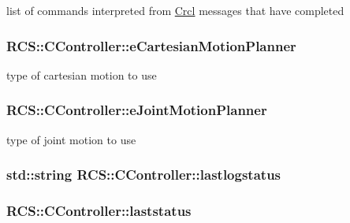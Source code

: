 list of commands interpreted from \hyperlink{namespaceCrcl}{Crcl} messages that have completed \hypertarget{structRCS_1_1CController_a4174fd5467045e780fe53bde42e70735}{
\subsubsection[{e\-Cartesian\-Motion\-Planner}]{ R\-C\-S\-::\-C\-Controller\-::e\-Cartesian\-Motion\-Planner}}\label{structRCS_1_1CController_a4174fd5467045e780fe53bde42e70735}
type of cartesian motion to use \hypertarget{structRCS_1_1CController_ad788d0def2101be74b680394bcbc78e7}{
\subsubsection[{e\-Joint\-Motion\-Planner}]{ R\-C\-S\-::\-C\-Controller\-::e\-Joint\-Motion\-Planner}}\label{structRCS_1_1CController_ad788d0def2101be74b680394bcbc78e7}
type of joint motion to use \hypertarget{structRCS_1_1CController_a8bd2705747d1e16f5806ddf183bfade7}{
\subsubsection[{lastlogstatus}]{\setlength{\rightskip}{0pt plus 5cm}std\-::string R\-C\-S\-::\-C\-Controller\-::lastlogstatus}}\label{structRCS_1_1CController_a8bd2705747d1e16f5806ddf183bfade7}
\hypertarget{structRCS_1_1CController_af76ac9412dbefbaebc970d62f88a40fa}{
\subsubsection[{laststatus}]{ R\-C\-S\-::\-C\-Controller\-::laststatus\hspace{0.3cm}{\ttfamily [static]}}}\label{structRCS_1_1CController_af76ac9412dbefbaebc970d62f88a40fa}

